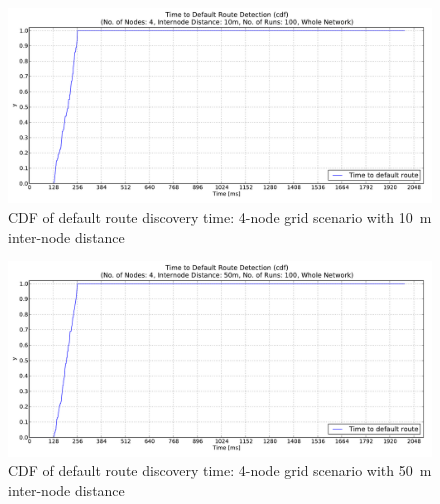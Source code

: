 \begin{figure}[h]
  \begin{center}
  \vspace{-10pt}
    \leavevmode
      \includegraphics[scale=0.38]
      {Pics/results/4/MRHOF/grid/dist10_montecarlo_cdf_hist.pdf}
   \caption{CDF of default route discovery time: 4-node grid scenario with 10~m inter-node distance}
   \label{fig:4_MRHOF_grid_10_cdf}
  \end{center}
\end{figure}

\begin{figure}[htpb]
  \begin{center}
  \vspace{-20pt}
    \leavevmode
      \includegraphics[scale=0.38]
      {Pics/results/4/MRHOF/grid/dist50_montecarlo_cdf_hist.pdf}
   \caption{CDF of default route discovery time: 4-node grid scenario with 50~m inter-node distance}
   \label{fig:4_MRHOF_grid_50_cdf}
  \end{center}
\end{figure}


